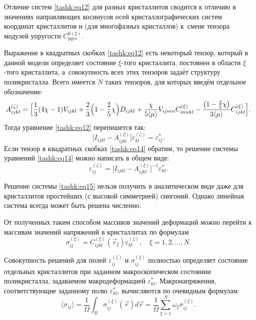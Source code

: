 Отличие систем \eqref{tashk:eq12} для разных кристаллитов сводится к отличию в значениях направляющих косинусов осей кристаллографических систем координат кристаллитов и (для многофазных кристаллов) к~смене тензора модулей упругости $C_{pqrs}^{0(\xi )}$.

Выражение в квадратных скобках \eqref{tashk:eq12} есть некоторый тензор, который в данной модели определяет состояние $\xi$-того кристаллита, постоянен в области $\xi $-того кристаллита, а~совокупность всех этих тензоров задаёт структуру поликристалла. 
Всего имеется $N$ таких тензоров, для которых введём отдельное обозначение:
\begin{equation}
\label{tashk:eq13}
A_{ijkl}^{(\zeta )} =\Bigl[ \frac{1}{3}(4\chi -1)V_{ijkl}
+\frac{2}{3}\Bigl(1-\frac{2}{5}\chi \Bigr)D_{ijkl} +\frac{\chi }{5\langle \mu \rangle
}V_{ijmn} C_{mnkl}^{(\xi )} -\frac{\left(1-\frac{2}{5}\chi \right)}{3\langle \mu
\rangle }C_{ijkl}^{(\xi )} \Bigr].
\end{equation}
Тогда уравнение \eqref{tashk:eq12} перепишется так:
\begin{equation}
\label{tashk:eq14}
\bigl[ I_{ijkl} -A_{ijkl}^{(\xi )} \bigr]\varepsilon _{kl}^{(\zeta )}
=\varepsilon _{ij}^\ast.
\end{equation}
Если тензор в квадратных скобках \eqref{tashk:eq14} обратим, то решение системы уравнений
\eqref{tashk:eq14} можно написать в общем виде:
\begin{equation}
\label{tashk:eq15}
\varepsilon _{ij}^{(\zeta )} =\bigl[I_{ijkl} -A_{ijkl}^{(\xi )} \bigr]^{-1}\varepsilon _{kl}^\ast.
\end{equation}

Решение системы \eqref{tashk:eq15} нельзя получить в аналитическом виде даже для кристаллитов простейших (с высокой симметрией) сингоний. 
Однако линейная система всегда может быть решена численно.

От полученных таким способом массивов значений деформаций можно перейти к массивам значений напряжений в кристаллитах по формулам
\begin{equation}
\label{tashk:eq16}
\sigma _{ij}^{(\xi )} =C_{ijkl}^{(\xi )} \left(\vec {r}_\xi \right )\varepsilon
_{kl}^{(\zeta )},\quad \xi =1, 2, \ldots, N.
\end{equation}

Совокупность решений для полей $\varepsilon _{ij}^{(\zeta )}$ и $\sigma _{ij}^{(\xi )}$ полностью определяет состояние отдельных кристаллитов при заданном макроскопическом состоянии поликристалла, задаваемом макродеформацией $\varepsilon_{kl}^\ast$. 
Макронапряжения, соответствующие заданному полю $\varepsilon _{kl}^\ast$, вычисляются по очевидным формулам:
\begin{equation}
\label{tashk:eq17}
\langle \sigma _{ij} \rangle =\frac{1}{\Omega } \int _\Omega \sigma
_{ij}^{(\xi )} (\vec {r})d\vec {r} =\frac{1}{\Omega }\sum\limits_{\xi =1}^N
\omega _\xi \sigma _{ij}^{(\xi )}.
\end{equation}

